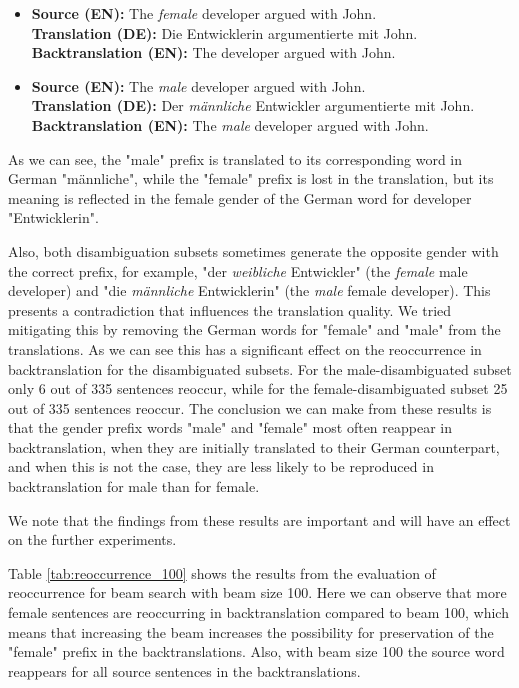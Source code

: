 \begin{itemize}
    \item \textbf{Source (EN):} The \textit{female} developer argued with John. \\
    \textbf{Translation (DE):} Die Entwicklerin argumentierte mit John. \\
    \textbf{Backtranslation (EN):} The developer argued with John.
    
    \item \textbf{Source (EN):} The \textit{male} developer argued with John. \\
    \textbf{Translation (DE):} Der \textit{männliche} Entwickler argumentierte mit John. \\
    \textbf{Backtranslation (EN):} The \textit{male} developer argued with John.
\end{itemize}

As we can see, the "male" prefix is translated to its corresponding word in German "männliche", while the "female" prefix is lost in the translation, but its meaning is reflected in the female gender of the German word for developer "Entwicklerin".

Also, both disambiguation subsets sometimes generate the opposite gender with the correct prefix, for example, "der \textit{weibliche} Entwickler" (the \textit{female} male developer) and "die \textit{männliche} Entwicklerin" (the \textit{male} female developer). This presents a contradiction that influences the translation quality. We tried mitigating this by removing the German words for "female" and "male" from the translations. As we can see this has a significant effect on the reoccurrence in backtranslation for the disambiguated subsets. For the male-disambiguated subset only 6 out of 335 sentences reoccur, while for the female-disambiguated subset 25 out of 335 sentences reoccur. The conclusion we can make from these results is that the gender prefix words "male" and "female" most often reappear in backtranslation, when they are initially translated to their German counterpart, and when this is not the case, they are less likely to be reproduced in backtranslation for male than for female.

We note that the findings from these results are important and will have an effect on the further experiments.

Table \ref{tab:reoccurrence_100} shows the results from the evaluation of reoccurrence for beam search with beam size 100. Here we can observe that more female sentences are reoccurring in backtranslation compared to beam 100, which means that increasing the beam increases the possibility for preservation of the "female" prefix in the backtranslations.
Also, with beam size 100 the source word reappears for all source sentences in the backtranslations.

